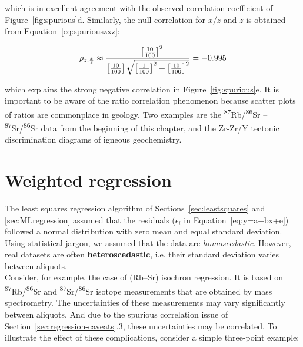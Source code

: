 \begin{enumerate}
\noindent which is in excellent agreement with the observed
correlation coefficient of Figure~\ref{fig:spurious}d. Similarly, the
null correlation for $x/z$ and $z$ is obtained from
Equation~\ref{eq:spuriouszxz}:

\begin{equation*}
  \noindent \rho_{z,\frac{x}{z}} \approx
  \frac{
    - \left[\frac{10}{100}\right]^2
  }{
    \left[\frac{10}{100}\right]
    \sqrt{\left[\frac{1}{100}\right]^2 +
      \left[\frac{10}{100}\right]^2
    }
  } = -0.995
\end{equation*}

\noindent which explains the strong negative correlation in
Figure~\ref{fig:spurious}e.  It is important to be aware of the ratio
correlation phenomenon because scatter plots of ratios are commonplace
in geology. Two examples are the
\textsuperscript{87}Rb/\textsuperscript{86}Sr --
\textsuperscript{87}Sr/\textsuperscript{86}Sr data from the beginning
of this chapter, and the Zr-Zr/Y tectonic discrimination diagrams of
igneous geochemistry.
 
\end{enumerate}

\section{Weighted regression}
\label{sec:weightedregression}

The least squares regression algorithm of
Sections~\ref{sec:leastsquares} and \ref{sec:MLregression} assumed
that the residuals ($\epsilon_i$ in Equation~\ref{eq:y=a+bx+e})
followed a normal distribution with zero mean and equal standard
deviation. Using statistical jargon, we assumed that the data are
\emph{homoscedastic}. However, real datasets are often
\textbf{heteroscedastic}, i.e. their standard deviation varies between
aliquots.\\

Consider, for example, the case of (Rb--Sr) isochron regression.  It
is based on \textsuperscript{87}Rb/\textsuperscript{86}Sr and
\textsuperscript{87}Sr/\textsuperscript{86}Sr isotope measurements
that are obtained by mass spectrometry. The uncertainties of these
measurements may vary significantly between aliquots. And due to the
spurious correlation issue of Section~\ref{sec:regression-caveats}.3,
these uncertainties may be correlated. To illustrate the effect of
these complications, consider a simple three-point example:

